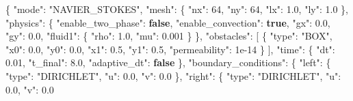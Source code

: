 \documentclass[
  10pt,
]{article}
\newenvironment{Shaded}{}{}
\newcommand{\DataTypeTok}[1]{\textcolor[rgb]{0.56,0.13,0.00}{#1}}
\newcommand{\DecValTok}[1]{\textcolor[rgb]{0.25,0.63,0.44}{#1}}
\newcommand{\FloatTok}[1]{\textcolor[rgb]{0.25,0.63,0.44}{#1}}
\newcommand{\FunctionTok}[1]{\textcolor[rgb]{0.02,0.16,0.49}{#1}}
\newcommand{\KeywordTok}[1]{\textcolor[rgb]{0.00,0.44,0.13}{\textbf{#1}}}
\newcommand{\OtherTok}[1]{\textcolor[rgb]{0.00,0.44,0.13}{#1}}
\newcommand{\StringTok}[1]{\textcolor[rgb]{0.25,0.44,0.63}{#1}}
\begin{document}
\begin{Shaded}
\begin{Highlighting}[]
\FunctionTok{\{}
  \DataTypeTok{"mode"}\FunctionTok{:} \StringTok{"NAVIER\_STOKES"}\FunctionTok{,}
  \DataTypeTok{"mesh"}\FunctionTok{:} \FunctionTok{\{}
    \DataTypeTok{"nx"}\FunctionTok{:} \DecValTok{64}\FunctionTok{,}
    \DataTypeTok{"ny"}\FunctionTok{:} \DecValTok{64}\FunctionTok{,}
    \DataTypeTok{"lx"}\FunctionTok{:} \FloatTok{1.0}\FunctionTok{,}
    \DataTypeTok{"ly"}\FunctionTok{:} \FloatTok{1.0}
  \FunctionTok{\},}
  \DataTypeTok{"physics"}\FunctionTok{:} \FunctionTok{\{}
    \DataTypeTok{"enable\_two\_phase"}\FunctionTok{:} \KeywordTok{false}\FunctionTok{,}
    \DataTypeTok{"enable\_convection"}\FunctionTok{:} \KeywordTok{true}\FunctionTok{,}
    \DataTypeTok{"gx"}\FunctionTok{:} \FloatTok{0.0}\FunctionTok{,}
    \DataTypeTok{"gy"}\FunctionTok{:} \FloatTok{0.0}\FunctionTok{,}
    \DataTypeTok{"fluid1"}\FunctionTok{:} \FunctionTok{\{}
      \DataTypeTok{"rho"}\FunctionTok{:} \FloatTok{1.0}\FunctionTok{,}
      \DataTypeTok{"mu"}\FunctionTok{:} \FloatTok{0.001}
    \FunctionTok{\}}
  \FunctionTok{\},}
  \DataTypeTok{"obstacles"}\FunctionTok{:} \OtherTok{[}
    \FunctionTok{\{}
      \DataTypeTok{"type"}\FunctionTok{:} \StringTok{"BOX"}\FunctionTok{,}
      \DataTypeTok{"x0"}\FunctionTok{:} \FloatTok{0.0}\FunctionTok{,}
      \DataTypeTok{"y0"}\FunctionTok{:} \FloatTok{0.0}\FunctionTok{,}
      \DataTypeTok{"x1"}\FunctionTok{:} \FloatTok{0.5}\FunctionTok{,}
      \DataTypeTok{"y1"}\FunctionTok{:} \FloatTok{0.5}\FunctionTok{,}
      \DataTypeTok{"permeability"}\FunctionTok{:} \DecValTok{1e{-}14}
    \FunctionTok{\}}
  \OtherTok{]}\FunctionTok{,}
  \DataTypeTok{"time"}\FunctionTok{:} \FunctionTok{\{}
    \DataTypeTok{"dt"}\FunctionTok{:} \FloatTok{0.01}\FunctionTok{,}
    \DataTypeTok{"t\_final"}\FunctionTok{:} \FloatTok{8.0}\FunctionTok{,}
    \DataTypeTok{"adaptive\_dt"}\FunctionTok{:} \KeywordTok{false}
  \FunctionTok{\},}
  \DataTypeTok{"boundary\_conditions"}\FunctionTok{:} \FunctionTok{\{}
    \DataTypeTok{"left"}\FunctionTok{:} \FunctionTok{\{}
      \DataTypeTok{"type"}\FunctionTok{:} \StringTok{"DIRICHLET"}\FunctionTok{,}
      \DataTypeTok{"u"}\FunctionTok{:} \FloatTok{0.0}\FunctionTok{,}
      \DataTypeTok{"v"}\FunctionTok{:} \FloatTok{0.0}
    \FunctionTok{\},}
    \DataTypeTok{"right"}\FunctionTok{:} \FunctionTok{\{}
      \DataTypeTok{"type"}\FunctionTok{:} \StringTok{"DIRICHLET"}\FunctionTok{,}
      \DataTypeTok{"u"}\FunctionTok{:} \FloatTok{0.0}\FunctionTok{,}
      \DataTypeTok{"v"}\FunctionTok{:} \FloatTok{0.0}

\end{Highlighting}
\end{Shaded}
\end{document}

